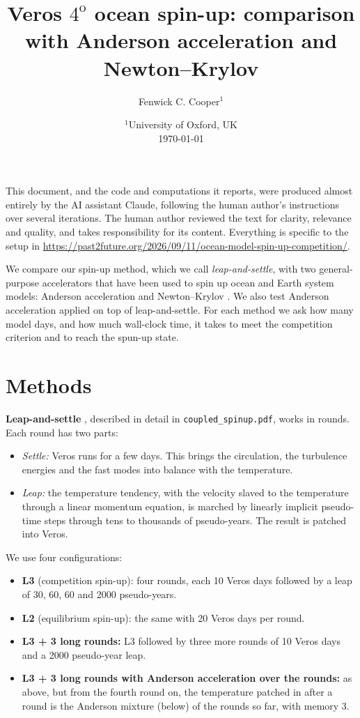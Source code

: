 \documentclass{article}
\title{Veros $4^{\text{o}}$ ocean spin-up: comparison with Anderson acceleration and Newton--Krylov}
\author{Fenwick C. Cooper$^1$}
\date{%
    $^1$University of Oxford, UK \\[2ex]
    \today
}
\begin{document}
\maketitle

This document, and the code and computations it reports, were produced almost entirely by the AI assistant Claude, following the human author's instructions over several iterations. The human author reviewed the text for clarity, relevance and quality, and takes responsibility for its content. Everything is specific to the setup in \url{https://past2future.org/2026/09/11/ocean-model-spin-up-competition/}.

We compare our spin-up method, which we call \emph{leap-and-settle}, with two general-purpose accelerators that have been used to spin up ocean and Earth system models: Anderson acceleration \cite{walkerni2011,khatiwala2024} and Newton--Krylov \cite{knollkeyes2004,merliskhatiwala2008,bernsen2008}. We also test Anderson acceleration applied on top of leap-and-settle. For each method we ask how many model days, and how much wall-clock time, it takes to meet the competition criterion and to reach the spun-up state.

\section*{Methods}

\textbf{Leap-and-settle} \cite{Cooper2017}, described in detail in \texttt{coupled\_spinup.pdf}, works in rounds. Each round has two parts:
\begin{itemize}
\item \emph{Settle:} Veros runs for a few days. This brings the circulation, the turbulence energies and the fast modes into balance with the temperature.
\item \emph{Leap:} the temperature tendency, with the velocity slaved to the temperature through a linear momentum equation, is marched by linearly implicit pseudo-time steps \cite{kelleykeyes1998} through tens to thousands of pseudo-years. The result is patched into Veros.
\end{itemize}
We use four configurations:
\begin{itemize}
\item \textbf{L3} (competition spin-up): four rounds, each 10 Veros days followed by a leap of 30, 60, 60 and 2000 pseudo-years.
\item \textbf{L2} (equilibrium spin-up): the same with 20 Veros days per round.
\item \textbf{L3 + 3 long rounds:} L3 followed by three more rounds of 10 Veros days and a 2000 pseudo-year leap.
\item \textbf{L3 + 3 long rounds with Anderson acceleration over the rounds:} as above, but from the fourth round on, the temperature patched in after a round is the Anderson mixture (below) of the rounds so far, with memory 3.
\end{itemize}
\end{document}
